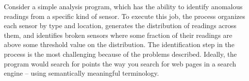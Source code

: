 




Consider a simple analysis program, which has the ability
to identify anomalous readings from a specific kind of sensor. To execute this job, 
the process organizes each sensor by type and location, generates the distribution of
readings across them, and identifies broken sensors where some fraction of
their readings are above some threshold value on the distribution.
The identification step in the process is the most challenging 
because of the problems described.  Ideally, the program would search for points the
way you search for web pages in a search engine -- using semantically meaningful 
terminology. 

